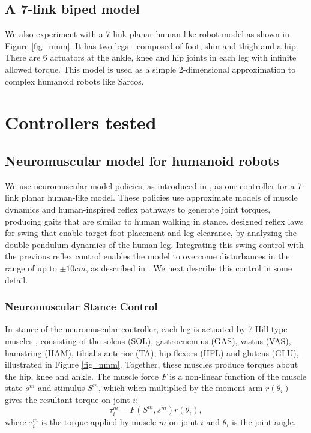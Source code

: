 \subsection{A 7-link biped model}
We also experiment with a 7-link planar human-like robot model as shown in Figure \ref{fig_nmm}. It has two legs - composed of foot, shin and thigh and a hip. There are 6 actuators at the ankle, knee and hip joints in each leg with infinite allowed torque. This model is used as a simple 2-dimensional approximation to complex humanoid robots like Sarcos. 

\section{Controllers tested}

\subsection{Neuromuscular model for humanoid robots}

\label{sec:NMC}
We use neuromuscular model policies, as introduced in \cite{geyer2010muscle}, as our controller for a 7-link planar human-like model. These policies use approximate models of muscle dynamics and human-inspired reflex pathways to generate joint torques, producing gaits that are similar to human walking in stance. \cite{desai} designed reflex laws for swing that enable target foot-placement and leg clearance, by analyzing the double pendulum dynamics of the human leg. Integrating this swing control with the previous reflex control enables the model to overcome disturbances in the range of up to $\pm 10 cm$, as described in \cite{song2015neural}. We next describe this control in some detail.

\subsubsection{Neuromuscular Stance Control} 

In stance of the neuromuscular controller, each leg is actuated by 7 Hill-type muscles \cite{morrison1970mechanics}, consisting of the soleus (SOL), gastrocnemius (GAS), vastus (VAS), hamstring (HAM), tibialis anterior (TA), hip flexors (HFL) and gluteus (GLU), illustrated in Figure \ref{fig_nmm}. Together, these muscles produce torques about the hip, knee and ankle. The muscle force $F$ is a non-linear function of the muscle state $s^m$ and stimulus $S^m$, which when multiplied by the moment arm $r(\theta_i)$ gives the resultant torque on joint $i$:
\begin{equation*}
\tau_i^m = F(S^m, s^m)r(\theta_i),
\end{equation*}   
where $\tau_i^m$ is the torque applied by muscle $m$ on joint $i$ and $\theta_i$ is the joint angle.
 
